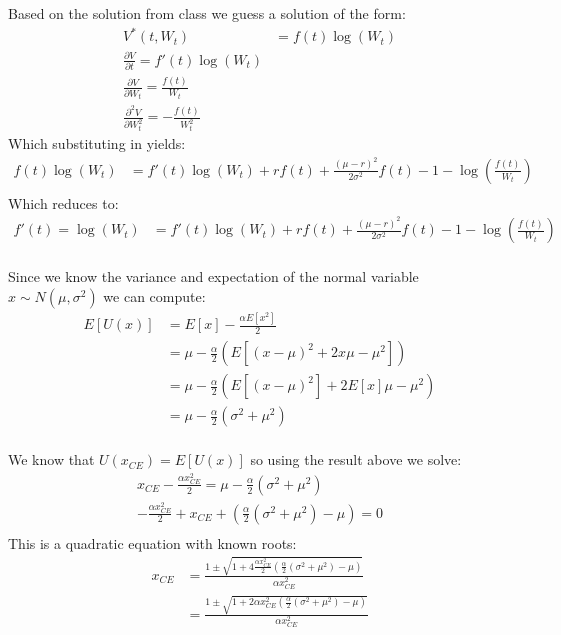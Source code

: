 \documentclass{article}[12pt]
\begin{document}
Based on the solution from class we guess a solution of the form:
\begin{align*}
V^*(t,W_t) &= f(t)\log(W_t) \\
\frac{\partial V}{\partial t} = f'(t)\log(W_t)\\
\frac{\partial V}{\partial W_t} = \frac{f(t)}{W_t}\\
\frac{\partial^2 V}{\partial W_t^2} = -\frac{f(t)}{W_t^2}
\end{align*}
Which substituting in yields:
\begin{align*}
f(t)\log(W_t) &=  f'(t)\log(W_t) + rf(t)+\frac{(\mu-r)^2}{2\sigma^2}f(t) - 1-\log(\frac{f(t)}{W_t})\\
\end{align*}
Which reduces to:
\begin{align*}
f'(t) = \log(W_t) &=  f'(t)\log(W_t) + rf(t)+\frac{(\mu-r)^2}{2\sigma^2}f(t) - 1-\log(\frac{f(t)}{W_t})\\
\end{align*}

Since we know the variance and expectation of the normal variable $x\sim N(\mu,\sigma^2) $ we can compute:
\begin{align*}
E[U(x)] &= E[x] -\frac{\alpha E[x^2]}{2}\\
&= \mu - \frac{\alpha}{2}(E[ (x-\mu)^2 +2x\mu - \mu^2 ])\\
&= \mu - \frac{\alpha}{2}(E[ (x-\mu)^2] +2E[x]\mu - \mu^2 )\\
&= \mu - \frac{\alpha}{2}(\sigma^2 + \mu^2 )\\
\end{align*}

We know that $U(x_{CE}) = E[U(x)]$ so using the result above we solve:
\begin{align*}
x_{CE} -\frac{\alpha x_{CE}^2}{2} =  \mu - \frac{\alpha}{2}(\sigma^2 + \mu^2 )\\
-\frac{\alpha x_{CE}^2}{2} + x_{CE} + (\frac{\alpha}{2}(\sigma^2 + \mu^2 ) - \mu)=  0\\
\end{align*}
This is a quadratic equation with known roots:
\begin{align*}
x_{CE} &= \frac{1 \pm \sqrt{1 + 4 \frac{\alpha x_{CE}^2}{2} (\frac{\alpha}{2}(\sigma^2 + \mu^2 ) - \mu)}}{\alpha x_{CE}^2}\\
	 &= \frac{1 \pm \sqrt{1 + 2\alpha x_{CE}^2 (\frac{\alpha}{2}(\sigma^2 + \mu^2 ) - \mu)}}{\alpha x_{CE}^2}\\
\end{align*}
\end{document}
